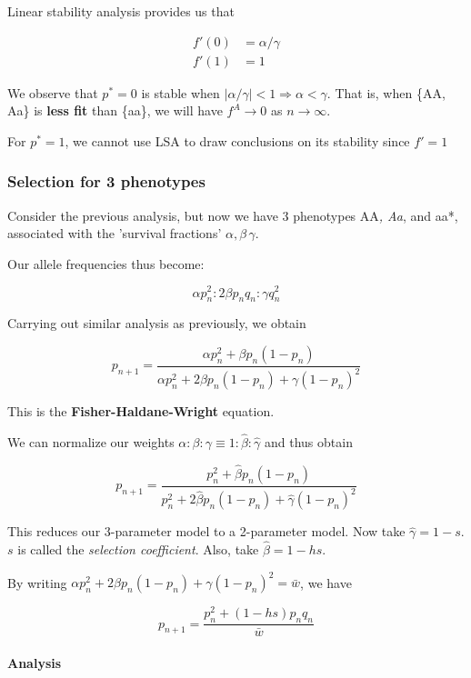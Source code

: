 \documentclass[11pt]{article}
\begin{document}
Linear stability analysis provides us that

\begin{align*}
    f'(0) &= \alpha/\gamma\\
    f'(1) &= 1
\end{align*}

We observe that \(p^* = 0\) is stable when
\(|\alpha/\gamma| < 1 \Rightarrow \alpha < \gamma\). That is, when \{AA,
Aa\} is \textbf{less fit} than \{aa\}, we will have \(f^A \to 0\) as
\(n \to \infty\).

For \(p^* = 1\), we cannot use LSA to draw conclusions on its stability
since \(f' = 1\)

\subsubsection{Selection for 3
phenotypes}\label{selection-for-3-phenotypes}

Consider the previous analysis, but now we have 3 phenotypes AA\emph{,
Aa}, and aa*, associated with the 'survival fractions'
\(\alpha, \beta\, \gamma\).

Our allele frequencies thus become:

\[\alpha p_n^2 : 2\beta p_n q_n : \gamma q_n^2\]

Carrying out similar analysis as previously, we obtain

\[p_{n+1} = \dfrac{\alpha p_n^2 + \beta p_n(1-p_n)}{\alpha p_n^2 + 2\beta p_n (1-p_n) + \gamma (1-p_n)^2}\]

This is the \textbf{Fisher-Haldane-Wright} equation.

We can normalize our weights
\(\alpha : \beta : \gamma \equiv 1 : \hat{\beta} : \hat{\gamma}\) and
thus obtain

\[p_{n+1} = \dfrac{p_n^2 + \hat{\beta}p_n(1-p_n)}{p_n^2 + 2\hat{\beta}p_n(1-p_n) + \hat{\gamma}(1-p_n)^2}\]

This reduces our 3-parameter model to a 2-parameter model. Now take
\(\hat\gamma = 1 -s\). \(s\) is called the \emph{selection coefficient}.
Also, take \(\hat\beta = 1 - hs\).

By writing
\(\alpha p_n^2 + 2\beta p_n (1-p_n) + \gamma (1-p_n)^2 = \bar{w}\), we
have

\[p_{n+1} = \dfrac{p_n^2 + (1-hs)p_nq_n}{\bar w}\]

\paragraph{Analysis}\label{analysis}
\end{document}
